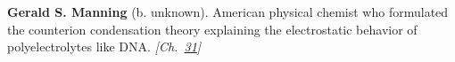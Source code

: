 \textbf{Gerald S. Manning} (b. unknown). American physical chemist who formulated the counterion condensation theory explaining the electrostatic behavior of polyelectrolytes like DNA. \emph{[Ch.~\hyperref[ch:osmosisdebye]{31}]}

